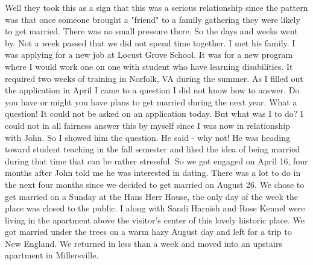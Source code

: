 Well they took this as a sign that this was a serious relationship since the pattern was that once someone brought a "friend" to a family gathering they were likely to get married. There was no small pressure there. So the days and weeks went by. Not a week passed that we did not spend time together. I met his family. I was applying for a new job at Locust Grove School. It was for a new program where I would work one on one with student who have learning disabilities. It required two weeks of training in Norfolk, VA during the summer. As I filled out the application in April I came to a question I did not know how to answer. Do you have or might you have plans to get married during the next year. What a question! It could not be asked on an application today. But what was I to do? I could not in all fairness answer this by myself since I was now in relationship with John. So I showed him the question. He said - why not! He was heading toward student teaching in the fall semester and liked the idea of being married during that time that can be rather stressful. So we got engaged on April 16, four months after John told me he was interested in dating. There was a lot to do in the next four months since we decided to get married on August 26. We chose to get married on a Sunday at the Hans Herr House, the only day of the week the place was closed to the public. I along with Sandi Harnish and Rose Kennel were living in the apartment above the visitor's center of this lovely historic place. We got married under the trees on a warm hazy August day and left for a trip to New England. We returned in less than a week and moved into an upstairs apartment in Millersville.




